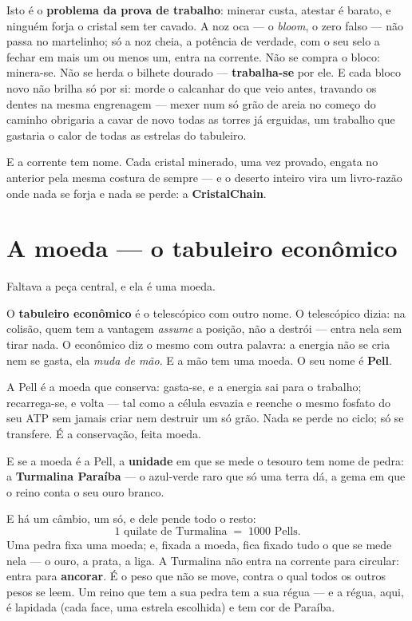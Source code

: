 \documentclass[livro.tex]{subfiles}
\begin{document}
\medskip

Isto é o \textbf{problema da prova de trabalho}: minerar custa, atestar é barato, e
ninguém forja o cristal sem ter cavado. A noz oca --- o \emph{bloom}, o zero falso ---
não passa no martelinho; só a noz cheia, a potência de verdade, com o seu selo a
fechar em mais um ou menos um, entra na corrente. Não se compra o bloco: minera-se. Não se herda o
bilhete dourado --- \textbf{trabalha-se} por ele. E cada bloco novo não brilha só por si:
morde o calcanhar do que veio antes, travando os dentes na mesma engrenagem --- mexer num
só grão de areia no começo do caminho obrigaria a cavar de novo todas as torres já
erguidas, um trabalho que gastaria o calor de todas as estrelas do tabuleiro.

\medskip

E a corrente tem nome. Cada cristal minerado, uma vez provado, engata no anterior pela
mesma costura de sempre --- e o deserto inteiro vira um livro-razão onde nada se forja
e nada se perde: a \textbf{CristalChain}.

\chapter{A moeda --- o tabuleiro econômico}

Faltava a peça central, e ela é uma moeda.

\medskip

O \textbf{tabuleiro econômico} é o telescópico com outro nome. O telescópico dizia: na colisão,
quem tem a vantagem \emph{assume} a posição, não a destrói --- entra nela sem tirar
nada. O econômico diz o mesmo com outra palavra: a energia não se cria nem se gasta,
ela \emph{muda de mão}. E a mão tem uma moeda. O seu nome é \textbf{Pell}.

\medskip

A Pell é a moeda que conserva: gasta-se, e a energia sai para o trabalho; recarrega-se,
e volta --- tal como a célula esvazia e reenche o mesmo fosfato do seu ATP sem jamais
criar nem destruir um só grão. Nada se perde no ciclo; só se transfere. É a
conservação, feita moeda.

\medskip

E se a moeda é a Pell, a \textbf{unidade} em que se mede o tesouro tem nome de pedra:
a \textbf{Turmalina Paraíba} --- o azul-verde raro que só uma terra dá, a gema em que
o reino conta o seu ouro branco.

\medskip

E há um câmbio, um só, e dele pende todo o resto:
\[
 \boxed{\;1\text{ quilate de Turmalina} \;=\; 1000\text{ Pells}.\;}
\]
Uma pedra fixa uma moeda; e, fixada a moeda, fica fixado tudo o que se mede nela --- o
ouro, a prata, a liga. A Turmalina não entra na corrente para circular: entra para
\textbf{ancorar}. É o peso que não se move, contra o qual todos os outros pesos se
leem. Um reino que tem a sua pedra tem a sua régua --- e a régua, aqui, é lapidada
(cada face, uma estrela escolhida) e tem cor de Paraíba.
\end{document}
